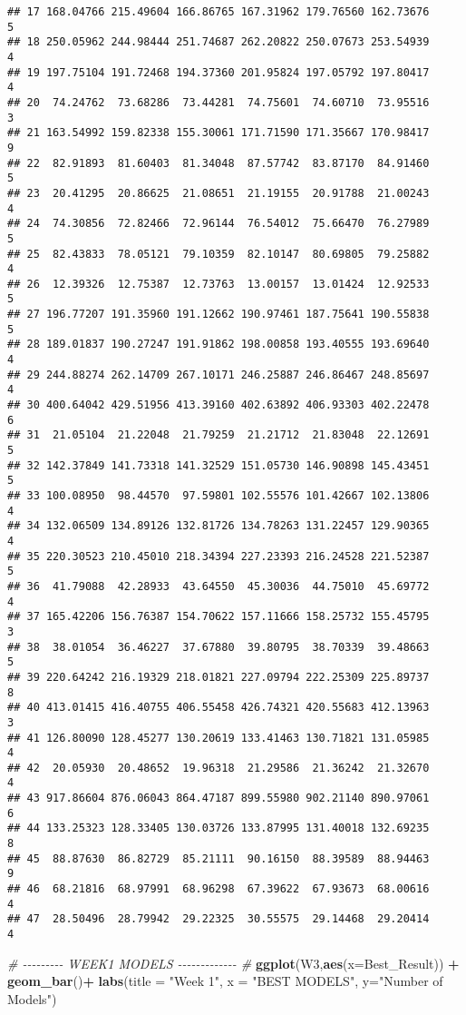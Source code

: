 \documentclass[
]{article}
\newenvironment{Shaded}{\begin{snugshade}}{\end{snugshade}}
\newcommand{\AttributeTok}[1]{\textcolor[rgb]{0.13,0.29,0.53}{#1}}
\newcommand{\CommentTok}[1]{\textcolor[rgb]{0.56,0.35,0.01}{\textit{#1}}}
\newcommand{\FunctionTok}[1]{\textcolor[rgb]{0.13,0.29,0.53}{\textbf{#1}}}
\newcommand{\NormalTok}[1]{#1}
\newcommand{\SpecialCharTok}[1]{\textcolor[rgb]{0.81,0.36,0.00}{\textbf{#1}}}
\newcommand{\StringTok}[1]{\textcolor[rgb]{0.31,0.60,0.02}{#1}}
\begin{document}
\begin{verbatim}
## 17 168.04766 215.49604 166.86765 167.31962 179.76560 162.73676           5
## 18 250.05962 244.98444 251.74687 262.20822 250.07673 253.54939           4
## 19 197.75104 191.72468 194.37360 201.95824 197.05792 197.80417           4
## 20  74.24762  73.68286  73.44281  74.75601  74.60710  73.95516           3
## 21 163.54992 159.82338 155.30061 171.71590 171.35667 170.98417           9
## 22  82.91893  81.60403  81.34048  87.57742  83.87170  84.91460           5
## 23  20.41295  20.86625  21.08651  21.19155  20.91788  21.00243           4
## 24  74.30856  72.82466  72.96144  76.54012  75.66470  76.27989           5
## 25  82.43833  78.05121  79.10359  82.10147  80.69805  79.25882           4
## 26  12.39326  12.75387  12.73763  13.00157  13.01424  12.92533           5
## 27 196.77207 191.35960 191.12662 190.97461 187.75641 190.55838           5
## 28 189.01837 190.27247 191.91862 198.00858 193.40555 193.69640           4
## 29 244.88274 262.14709 267.10171 246.25887 246.86467 248.85697           4
## 30 400.64042 429.51956 413.39160 402.63892 406.93303 402.22478           6
## 31  21.05104  21.22048  21.79259  21.21712  21.83048  22.12691           5
## 32 142.37849 141.73318 141.32529 151.05730 146.90898 145.43451           5
## 33 100.08950  98.44570  97.59801 102.55576 101.42667 102.13806           4
## 34 132.06509 134.89126 132.81726 134.78263 131.22457 129.90365           4
## 35 220.30523 210.45010 218.34394 227.23393 216.24528 221.52387           5
## 36  41.79088  42.28933  43.64550  45.30036  44.75010  45.69772           4
## 37 165.42206 156.76387 154.70622 157.11666 158.25732 155.45795           3
## 38  38.01054  36.46227  37.67880  39.80795  38.70339  39.48663           5
## 39 220.64242 216.19329 218.01821 227.09794 222.25309 225.89737           8
## 40 413.01415 416.40755 406.55458 426.74321 420.55683 412.13963           3
## 41 126.80090 128.45277 130.20619 133.41463 130.71821 131.05985           4
## 42  20.05930  20.48652  19.96318  21.29586  21.36242  21.32670           4
## 43 917.86604 876.06043 864.47187 899.55980 902.21140 890.97061           6
## 44 133.25323 128.33405 130.03726 133.87995 131.40018 132.69235           8
## 45  88.87630  86.82729  85.21111  90.16150  88.39589  88.94463           9
## 46  68.21816  68.97991  68.96298  67.39622  67.93673  68.00616           4
## 47  28.50496  28.79942  29.22325  30.55575  29.14468  29.20414           4
\end{verbatim}

\begin{Shaded}
\begin{Highlighting}[]
\CommentTok{\# {-}{-}{-}{-}{-}{-}{-}{-}{-} WEEK1 MODELS {-}{-}{-}{-}{-}{-}{-}{-}{-}{-}{-}{-}{-} \#}
\FunctionTok{ggplot}\NormalTok{(W3,}\FunctionTok{aes}\NormalTok{(}\AttributeTok{x=}\NormalTok{Best\_Result)) }\SpecialCharTok{+} \FunctionTok{geom\_bar}\NormalTok{()}\SpecialCharTok{+}
  \FunctionTok{labs}\NormalTok{(}\AttributeTok{title =} \StringTok{"Week 1"}\NormalTok{,}
       \AttributeTok{x =} \StringTok{"BEST MODELS"}\NormalTok{, }\AttributeTok{y=}\StringTok{"Number of Models"}\NormalTok{) }
\end{Highlighting}
\end{Shaded}
\end{document}
